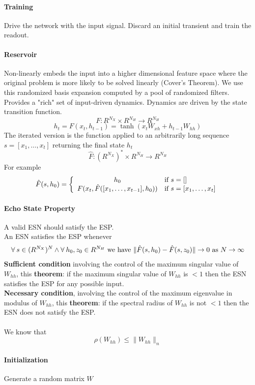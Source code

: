 \documentclass[10pt]{report}
\begin{document}
\paragraph{Training} Drive the network with the input signal. Discard an initial transient and train the readout.
\paragraph{Reservoir} Non-linearly embeds the input into a higher dimensional feature space where the original problem is more likely to be solved linearly (Cover's Theorem). We use this randomized basis expansion computed by a pool of randomized filters. Provides a "rich" set of input-driven dynamics. Dynamics are driven by the state transition function.
$$F:R^{N_X}\times R^{N_H}\rightarrow R^{N_H}$$
$$h_t = F(x_t, h_{t-1}) = \tanh(x_tW_{xh} + h_{t-1}W_{hh})$$
The iterated version is the function applied to an arbitrarily long sequence $s = [x_1,\ldots,x_t]$ returning the final state $h_t$
$$\hat{F}:(R^{N_X})^*\times R^{N_H}\rightarrow R^{N_H}$$
For example $$\hat{F}(s,h_0)=\left\{\begin{array}{c l}
h_0&\hbox{if }s=[]\\
F(x_t,\hat{F}([x_1,\ldots,x_{t-1}],h_0))&\hbox{if }s=[x_1,\ldots,x_t]
\end{array}\right.$$
\paragraph{Echo State Property} A valid ESN should satisfy the ESP.\\
An ESN satisfies the ESP whenever
$$\forall\:s\in (R^{N_X})^N \wedge \forall\:h_0,z_0\in R^{N_H}\hbox{ we have }\|\hat{F}(s, h_0)-\hat{F}(s,z_0)\|\rightarrow 0\hbox{ as }N\rightarrow\infty$$
\textbf{Sufficient condition} involving the control of the maximum singular value of $W_{hh}$, this \textbf{theorem}: if the maximum singular value of $W_{hh}$ is $< 1$ then the ESN satisfies the ESP for any possible input.\\
\textbf{Necessary condition}, involving the control of the maximum eigenvalue in modulus of $W_{hh}$, this \textbf{theorem}: if the spectral radius of $W_{hh}$ is not $< 1$ then the ESN does not satisfy the ESP.\\\\
We know that $$\rho(W_{hh})\leq \|W_{hh}\|_n$$
\paragraph{Initialization} Generate a random matrix $W$ %
\end{document}
